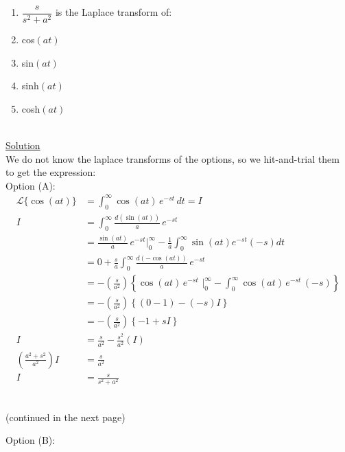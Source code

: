 \documentclass{article}
\begin{document}
\hfill\begin{minipage}{\linewidth}
    \begin{enumerate}
    \item[Q.13] $\dfrac{s}{s^2+a^2}$ is the Laplace transform of: 
    \item[(A)] cos$(at)$
    \item[(B)] sin$(at)$
    \item[(C)] sinh$(at)$
    \item[(D)] cosh$(at)$
    \end{enumerate}
    \end{minipage}\bigskip\\
\underline{Solution}\medskip\\
We do not know the laplace transforms of the options, so we hit-and-trial them to get the expression:\medskip\\
Option (A):\\
\begin{align*}
    \mathcal{L}\{\cos(at)\}&=\int_{0}^{\infty}\cos(at)\,e^{-st}\,dt=I\\
                          I&=\int_{0}^{\infty}\frac{d(\sin(at))}{a}\,e^{-st}\\
                           &=\frac{\sin(at)}{a}\,e^{-st}\Bigg|_0^\infty-\frac{1}{a}\int_{0}^{\infty}\sin(at)e^{-st}(-s)dt\\
                           &=0+\frac{s}{a}\int_0^\infty \frac{d(-\cos(at))}{a}\,e^{-st}\\
                           &=-(\frac{s}{a^2})\left\{\cos(at)\,e^{-st}\,\,\Bigg|_0^\infty-\int_0^\infty\cos(at)\,e^{-st}\,(-s)\right\}\\
                           &=-(\frac{s}{a^2})\left\{(0-1)-(-s)I\right\}\\
                           &=-(\frac{s}{a^2})\left\{-1+sI\right\}\\
                          I&=\frac{s}{a^2}-\frac{s^2}{a^2}(I)\\
       \left(\frac{a^2+s^2}{a^2}\right)I&=\frac{s}{a^2}\\
                          I&=\frac{s}{s^2+a^2}
\end{align*}\bigskip\\
\begin{center}
    (continued in the next page)
\end{center}
Option (B):
\end{document}
